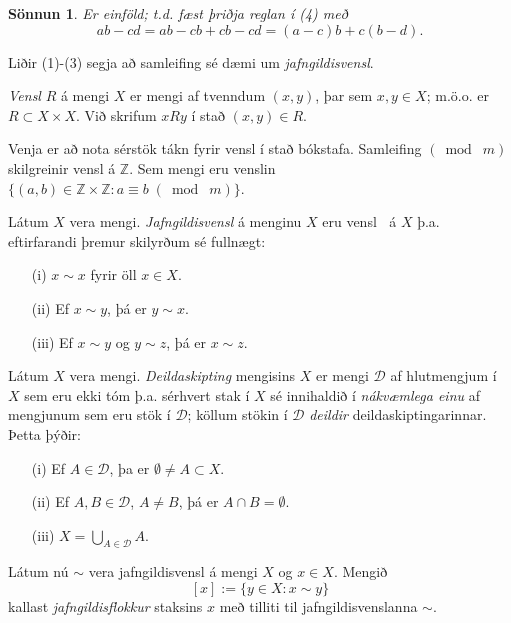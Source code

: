 \documentclass[a4paper,icelandic,11pt]{book}
\theoremstyle{plain}
\newtheorem*{sonnun}{Sönnun}
\newcommand{\Z}{\mathbb{Z}}
\begin{document}
\begin{sonnun}
  Er einföld; t.d. fæst þriðja reglan í (4) með
  \[ ab -cd = ab -cb + cb -cd = (a-c)b + c(b-d). \]
\end{sonnun}
Liðir (1)-(3) segja að samleifing sé dæmi um \emph{jafngildisvensl}.
\begin{skilgr}
  \emph{Vensl}
  $R$ á mengi $X$ er mengi af tvenndum $(x,y)$, þar sem $x,y\in
  X$; m.ö.o. er $R\subset X\times X$. Við skrifum $xRy$ í stað $(x,y)\in R$.
\end{skilgr}
Venja er að nota sérstök tákn fyrir vensl í stað bókstafa. Samleifing $(\bmod \;
m)$ skilgreinir vensl á $\Z$. Sem mengi eru venslin $\{ (a,b) \in \Z\times\Z :
a\equiv b \;(\bmod \; m) \}$.
\begin{skilgr}
  Látum $X$ vera mengi.
  \emph{Jafngildisvensl}
  á menginu $X$ eru vensl $~$ á $X$ þ.a. eftirfarandi þremur 
  skilyrðum sé fullnægt:
  \begin{itemize}
    \item [(i)] $x \sim x$ fyrir öll $x\in X$.
    \item [(ii)] Ef $x \sim y$, þá er $y \sim x$.
    \item [(iii)] Ef $x\sim y$ og $y\sim z$, þá er $x\sim z$.
  \end{itemize}
\end{skilgr}
\begin{skilgr}
  Látum $X$ vera mengi. \emph{Deildaskipting} mengisins
  $X$ er mengi $\mathcal D$ af hlutmengjum í $X$ sem eru ekki tóm þ.a. sérhvert
  stak í $X$ sé innihaldið í \emph{nákvæmlega einu} af mengjunum sem eru stök í
  $\mathcal D$; köllum stökin í $\mathcal D$ \emph{deildir}
  deildaskiptingarinnar. Þetta þýðir:
  \begin{itemize}
  \item [(i)] Ef $A\in\mathcal D$, þa er $\emptyset\neq A\subset X$.
  \item [(ii)] Ef $A,B\in \mathcal D$, $A\neq B$, þá er $A\cap B = \emptyset$.
  \item [(iii)] $X=\bigcup_{A\in\mathcal D} A$.
  \end{itemize}
\end{skilgr}
\begin{skilgr}
  Látum nú $\sim$ vera jafngildisvensl á mengi $X$ og $x\in X$. Mengið
  \[ [x] := \{ y\in X : x\sim y \} \]
  kallast \emph{jafngildisflokkur}
  staksins $x$ með tilliti til jafngildisvenslanna $\sim$.
\end{skilgr}
\end{document}
